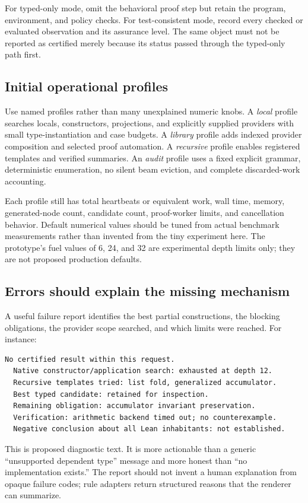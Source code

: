 For typed-only mode, omit the behavioral proof step but retain the program, environment, and policy checks. For test-consistent mode, record every checked or evaluated observation and its assurance level. The same object must not be reported as certified merely because its status passed through the typed-only path first.

\subsection{Initial operational profiles}
Use named profiles rather than many unexplained numeric knobs. A \emph{local} profile searches locals, constructors, projections, and explicitly supplied providers with small type-instantiation and case budgets. A \emph{library} profile adds indexed provider composition and selected proof automation. A \emph{recursive} profile enables registered templates and verified summaries. An \emph{audit} profile uses a fixed explicit grammar, deterministic enumeration, no silent beam eviction, and complete discarded-work accounting.

Each profile still has total heartbeats or equivalent work, wall time, memory, generated-node count, candidate count, proof-worker limits, and cancellation behavior. Default numerical values should be tuned from actual benchmark measurements rather than invented from the tiny experiment here. The prototype's fuel values of 6, 24, and 32 are experimental depth limits only; they are not proposed production defaults.

\subsection{Errors should explain the missing mechanism}
A useful failure report identifies the best partial constructions, the blocking obligations, the provider scope searched, and which limits were reached. For instance:
\begin{lstlisting}
No certified result within this request.
  Native constructor/application search: exhausted at depth 12.
  Recursive templates tried: list fold, generalized accumulator.
  Best typed candidate: retained for inspection.
  Remaining obligation: accumulator invariant preservation.
  Verification: arithmetic backend timed out; no counterexample.
  Negative conclusion about all Lean inhabitants: not established.
\end{lstlisting}
This is proposed diagnostic text. It is more actionable than a generic ``unsupported dependent type'' message and more honest than ``no implementation exists.'' The report should not invent a human explanation from opaque failure codes; rule adapters return structured reasons that the renderer can summarize.

